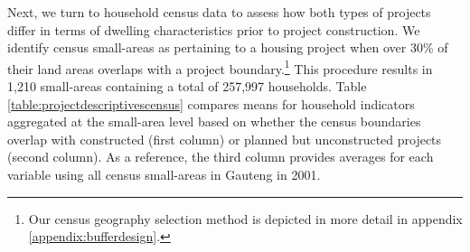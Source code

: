\documentclass[12pt]{article}
\begin{document}
% 



Next, we turn to household census data to assess how both types of projects differ in terms of dwelling characteristics prior to project construction. We identify census small-areas as pertaining to a housing project when over 30\% of their land areas overlaps with a project boundary.\footnote{Our census geography selection method is depicted in more detail in appendix \ref{appendix:bufferdesign}.} This procedure results in 1,210 small-areas containing a total of 257,997 households. Table \ref{table:projectdescriptivescensus} compares means for household indicators aggregated at the small-area level based on whether the census boundaries overlap with constructed (first column) or planned but unconstructed projects (second column). As a reference, the third column provides averages for each variable using all census small-areas in Gauteng in 2001. 
 
\end{document}
